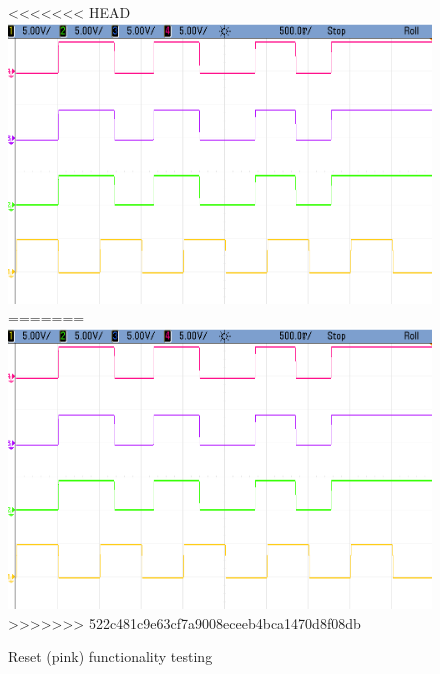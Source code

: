 \begin{figure}[H]
    \begin{center}
<<<<<<< HEAD
        \includegraphics[scale=0.3]{../Exercise1/Moore/report/images/e3e1_1_4nreset.png}
=======
        \includegraphics[width=0.75\linewidth]{./images/e3e1_1_4nreset.png}
>>>>>>> 522c481c9e63cf7a9008eceeb4bca1470d8f08db
        \caption{Reset (pink) functionality testing}
        \label{fig:moore_nres}
    \end{center}
\end{figure}

